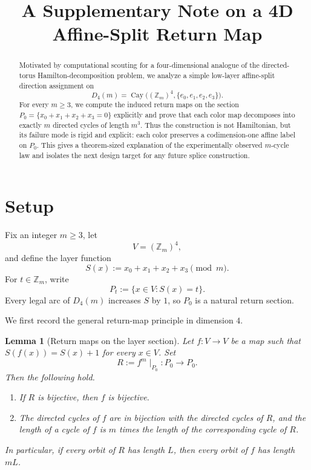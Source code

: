\documentclass[11pt]{article}
\title{A Supplementary Note on a 4D Affine-Split Return Map}
\author{}
\date{}
\newtheorem{lemma}{Lemma}
\theoremstyle{definition}
\theoremstyle{remark}
\newcommand{\Zm}{\mathbb Z_m}
\begin{document}
\maketitle

\begin{abstract}
Motivated by computational scouting for a four-dimensional analogue of the directed-torus Hamilton-decomposition problem, we analyze a simple low-layer affine-split direction assignment on
\[
D_4(m)=\operatorname{Cay}\bigl((\Zm)^4,\{e_0,e_1,e_2,e_3\}\bigr).
\]
For every $m\ge 3$, we compute the induced return maps on the section $P_0=\{x_0+x_1+x_2+x_3=0\}$ explicitly and prove that each color map decomposes into exactly $m$ directed cycles of length $m^3$. Thus the construction is not Hamiltonian, but its failure mode is rigid and explicit: each color preserves a codimension-one affine label on $P_0$. This gives a theorem-sized explanation of the experimentally observed $m$-cycle law and isolates the next design target for any future splice construction.
\end{abstract}

\section{Setup}
Fix an integer $m\ge 3$, let
\[
V=(\Zm)^4,
\]
and define the layer function
\[
S(x):=x_0+x_1+x_2+x_3 \pmod m.
\]
For $t\in \Zm$, write
\[
P_t:=\{x\in V:S(x)=t\}.
\]
Every legal arc of $D_4(m)$ increases $S$ by $1$, so $P_0$ is a natural return section.

We first record the general return-map principle in dimension $4$.

\begin{lemma}[Return maps on the layer section]\label{lem:return-general}
Let $f:V\to V$ be a map such that $S(f(x))=S(x)+1$ for every $x\in V$. Set
\[
R:=f^m\!\mid_{P_0}:P_0\to P_0.
\]
Then the following hold.
\begin{enumerate}[label=\textup{(\roman*)}]
    \item If $R$ is bijective, then $f$ is bijective.
    \item The directed cycles of $f$ are in bijection with the directed cycles of $R$, and the length of a cycle of $f$ is $m$ times the length of the corresponding cycle of $R$.
\end{enumerate}
In particular, if every orbit of $R$ has length $L$, then every orbit of $f$ has length $mL$.
\end{lemma}
\end{document}
